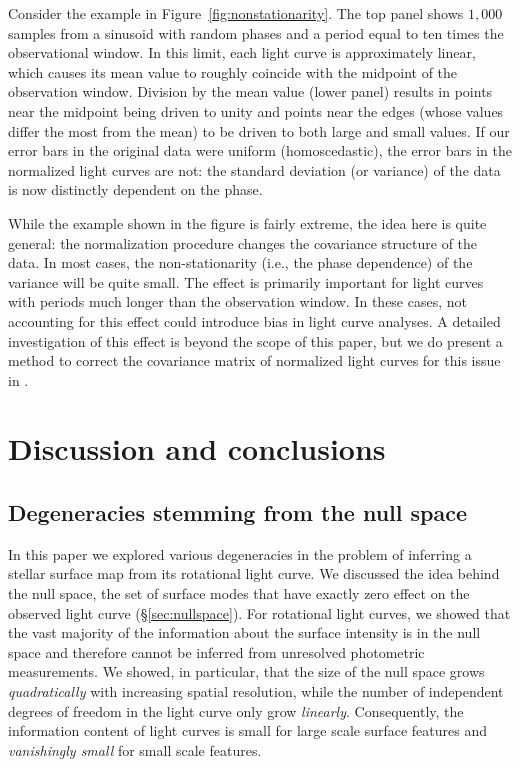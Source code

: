 \documentclass[modern]{aastex62}
\begin{document}
Consider the example in Figure~\ref{fig:nonstationarity}. The top panel
shows $1{,}000$ samples from a sinusoid with random phases and a period
equal to ten times the observational window.
%
In this limit, each light curve is approximately
linear, which causes its mean value to roughly coincide with the midpoint of the
observation window.
%
Division by the mean value (lower panel) results in points near the
midpoint being driven to unity and points near the edges (whose values differ
the most from the mean) to be driven to both large and small values.
%
If our error bars in the original data were uniform (homoscedastic),
the error bars in the normalized light curves are
not: the standard deviation (or variance) of the data is now
distinctly dependent on the phase.

While the example shown in the figure is fairly extreme, the idea here
is quite general: the normalization procedure changes the covariance
structure of the data. In most cases, the non-stationarity (i.e., the
phase dependence) of the variance will be quite small. The effect is primarily
important for light curves with periods much longer than
the observation window. In these cases, not accounting for this effect
could introduce bias in light curve analyses. A detailed investigation of
this effect is beyond the scope of this paper, but we do present a
method to correct the covariance matrix of normalized light curves for
this issue in .

\section{Discussion and conclusions}

\subsection{Degeneracies stemming from the null space}

In this paper we explored various degeneracies in the problem of
inferring a stellar surface map from its rotational light curve.
We discussed the idea behind the null space, the set of surface modes that
have exactly zero effect on the observed light curve (\S\ref{sec:nullspace}).
For rotational light curves, we showed that the vast majority of the information
about the surface intensity is in the null space and therefore cannot
be inferred from unresolved photometric measurements. We showed, in particular,
that the size of the null space grows \emph{quadratically} with increasing spatial
resolution, while the number of independent degrees of freedom in the light curve
only grow \emph{linearly}. Consequently, the information content of light
curves is small for large scale surface features and \emph{vanishingly small}
for small scale features.
\end{document}
